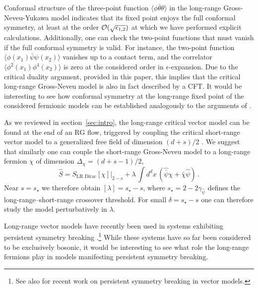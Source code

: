 \documentclass[aps,amsmath,amssymb,prd,showpacs,floatfix,preprint,superscriptaddress,nofootinbib,12pt]{article}
\begin{document}
Conformal structure of the three-point function $\langle \phi\bar\theta\theta\rangle$
in the long-range Gross-Neveu-Yukawa model indicates that its fixed
point enjoys the full conformal symmetry, at least at the order ${\cal O}(\sqrt{\epsilon_{1,2}})$
at which we have performed explicit calculations.
Additionally,  one can check the two-point functions
that must vanish if the full conformal symmetry is valid. For instance, the two-point function
$\langle \phi(x_1)\bar\psi\psi(x_2)\rangle$
vanishes up to a contact term, and the correlator $\langle \phi ^2(x_1)\phi^4(x_2)\rangle$
is  zero at the considered order in $\epsilon$-expansion.
Due to the critical duality argument,
provided in this paper, this implies that the critical long-range Gross-Neveu model
is also in fact described by a CFT. It would be interesting to see how conformal symmetry at the
long-range fixed point of the considered fermionic models can be established 
analogously to the arguments of \cite{Paulos:2015jfa,Behan:2017dwr,Behan:2017emf,Behan:2018hfx,Giuliani:2020aot}.


As we reviewed in section~\ref{sec:intro}, the long-range critical vector model can be
found at the end of an RG flow, triggered by coupling the critical short-range
vector model to a generalized free field of dimension $(d+s)/2$ \cite{Behan:2017dwr,Behan:2017emf}.
We suggest that similarly one can couple the short-range Gross-Neveu model
to a long-range fermion $\chi$ of dimension $\Delta_{\chi} = (d+s-1)/2$,
\begin{equation}
\hat S = S_{\textrm{LR Dirac}}[\chi]|_{2-s} + \lambda\,\int d^dx\,
(\hat{\bar\psi}\chi + \bar\chi\hat\psi)\,.
\end{equation} 
Near $s=s_\star$ we therefore obtain $[\lambda] = s_\star - s$, where 
$s_\star = 2-2\gamma_{\hat\psi}$ defines the long-range--short-range
crossover threshold. For small $\delta = s_\star - s$ one can therefore study
the model perturbatively in $\lambda$.

Long-range vector models have recently been used
in systems exhibiting persistent symmetry breaking \cite{Chai:2021djc}.\footnote{See
also \cite{Chai:2020zgq,Chai:2020hnu} for recent work on persistent symmetry breaking
in vector models.} While these systems have so far been considered to be exclusively bosonic,
it would be interesting to see what role the long-range
fermions play in models manifesting persistent symmetry breaking.
\end{document}
